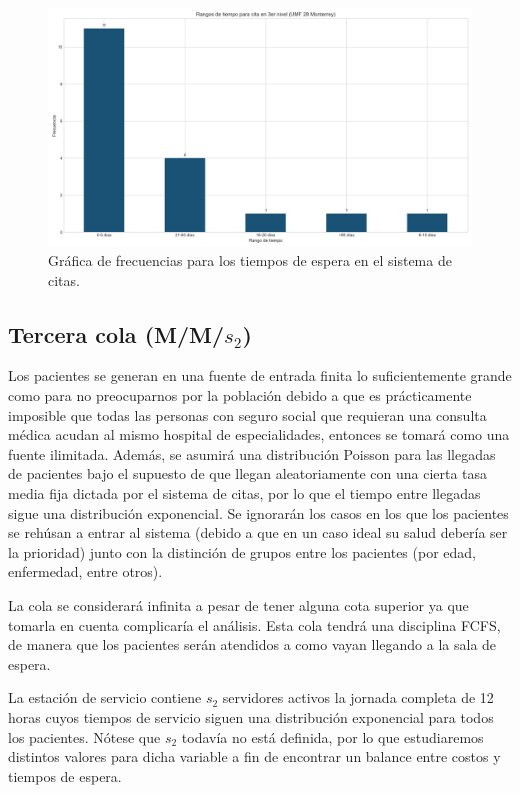 \documentclass[10pt]{article}
\begin{document}
    \begin{figure}[h]
    	\centering
    	\includegraphics[width=\linewidth]{./images/rangos-tiempo-3-umf28.png}
    	\caption{Gráfica de frecuencias para los tiempos de espera en el sistema de citas.}
    	\label{fig:frec_espera_cita}
    \end{figure}
    
    \subsection{Tercera cola (M/M/$s_{2}$)}
    Los pacientes se generan en una fuente de entrada finita lo suficientemente grande como para no preocuparnos por la población debido a que es prácticamente imposible que todas las personas con seguro social que requieran una consulta médica acudan al mismo hospital de especialidades, entonces se tomará como una fuente ilimitada. Además, se asumirá una distribución Poisson para las llegadas de pacientes bajo el supuesto de que llegan aleatoriamente con una cierta tasa media fija dictada por el sistema de citas, por lo que el tiempo entre llegadas sigue una distribución exponencial. Se ignorarán los casos en los que los pacientes se rehúsan a entrar al sistema (debido a que en un caso ideal su salud debería ser la prioridad) junto con la distinción de grupos entre los pacientes (por edad, enfermedad, entre otros).
    
    La cola se considerará infinita a pesar de tener alguna cota superior ya que tomarla en cuenta complicaría el análisis. Esta cola tendrá una disciplina FCFS, de manera que los pacientes serán atendidos a como vayan llegando a la sala de espera.
    
    La estación de servicio contiene $s_{2}$ servidores activos la jornada completa de 12 horas cuyos tiempos de servicio siguen una distribución exponencial para todos los pacientes. Nótese que $s_{2}$ todavía no está definida, por lo que estudiaremos distintos valores para dicha variable a fin de encontrar un balance entre costos y tiempos de espera.
    
\end{document}
